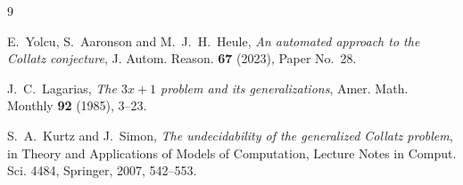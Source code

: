 \documentclass[11pt,reqno]{amsart}
\theoremstyle{remark}
\begin{document}
\begin{thebibliography}{9}

E.~Yolcu, S.~Aaronson and M.~J.~H.~Heule,
\emph{An automated approach to the Collatz conjecture},
J. Autom. Reason. \textbf{67} (2023), Paper No.~28.

J.~C.~Lagarias,
\emph{The $3x+1$ problem and its generalizations},
Amer. Math. Monthly \textbf{92} (1985), 3--23.

S.~A.~Kurtz and J.~Simon,
\emph{The undecidability of the generalized Collatz problem},
in Theory and Applications of Models of Computation,
Lecture Notes in Comput. Sci. 4484, Springer, 2007, 542--553.

\end{thebibliography}
\end{document}
